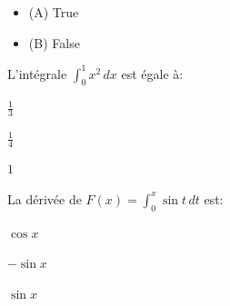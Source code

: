 \documentclass[12pt]{exam}
\begin{document}
\begin{questions}
\begin{itemize}[label={}]
  \item (A) True
  \item (B) False
\end{itemize}








\vspace{1em}





\question L'intégrale \( \int_0^1 x^2\,dx \) est égale à:



\begin{choices}

  
    \CorrectChoice $\tfrac{1}{3}$
  

  
    \choice $\tfrac{1}{4}$
  

  
    \choice $1$
  

\end{choices}









\vspace{1em}





\question La dérivée de \( F(x) = \int_0^x \sin t\,dt \) est:



\begin{choices}

  
    \choice $\cos x$
  

  
    \choice $-\sin x$
  

  
    \CorrectChoice $\sin x$
  

\end{choices}










\end{questions}
\end{document}

